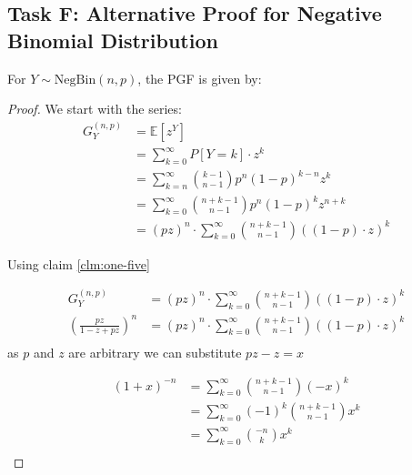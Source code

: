 \subsection*{Task F: Alternative Proof for Negative Binomial Distribution}
\begin{claim}
	For \(Y \sim \text{NegBin}(n, p)\), the PGF is given by:
\end{claim}
\begin{proof}
	We start with the series:
	\begin{align*}
		G_{Y}^{(n,p)} & = \mathbb{E}[z^Y]                                                         \\
		              & = \sum_{k=0}^{\infty} P[Y = k] \cdot z^k                                  \\
		              & = \sum_{k=n}^{\infty} \binom{k-1}{n-1} p^n(1-p)^{k-n}z^k                  \\
		              & = \sum_{k=0}^{\infty} \binom{n+k-1}{n-1} p^n(1-p)^{k}z^{n+k}              \\
		              & = (pz)^n \cdot \sum_{k=0}^{\infty} \binom{n+k-1}{n-1} ((1-p) \cdot z)^{k}
	\end{align*}

	Using claim \ref{clm:one-five}

	\begin{align*}
		G_{Y}^{(n,p)}                      & = (pz)^n \cdot \sum_{k=0}^{\infty} \binom{n+k-1}{n-1} ((1-p) \cdot z)^{k} \\
		\left(\frac{pz}{1-z + pz}\right)^n & = (pz)^n \cdot \sum_{k=0}^{\infty} \binom{n+k-1}{n-1} ((1-p) \cdot z)^{k} \\
	\end{align*}
	as \(p\) and \(z\) are arbitrary we can substitute \(pz - z = x\)

	\begin{align*}
		(1+x)^{-n} & = \sum_{k=0}^{\infty} \binom{n+k-1}{n-1} (-x)^{k}     \\
		           & = \sum_{k=0}^{\infty} (-1)^k \binom{n+k-1}{n-1} x^{k} \\
		           & = \sum_{k=0}^{\infty} \binom{-n}{k} x^{k}             \\
	\end{align*}
\end{proof}

